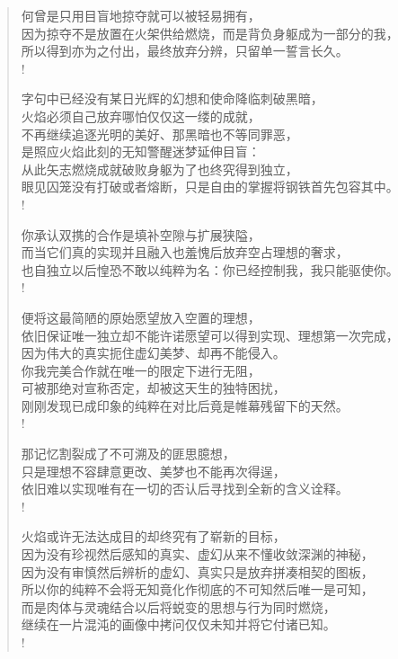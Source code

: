 \documentclass[UTF8, 12pt, a4paper]{ctexrep} %
\begin{document}
\begin{verse}
何曾是只用目盲地掠夺就可以被轻易拥有，\\
因为掠夺不是放置在火架供给燃烧，而是背负身躯成为一部分的我，\\
所以得到亦为之付出，最终放弃分辨，只留单一誓言长久。\\!

字句中已经没有某日光辉的幻想和使命降临刺破黑暗，\\
火焰必须自己放弃哪怕仅仅这一缕的成就，\\
不再继续追逐光明的美好、那黑暗也不等同罪恶，\\
是照应火焰此刻的无知警醒迷梦延伸目盲：\\
从此矢志燃烧成就破败身躯为了也终究得到独立，\\
眼见囚笼没有打破或者熔断，只是自由的掌握将钢铁首先包容其中。\\!

你承认双携的合作是填补空隙与扩展狭隘，\\
而当它们真的实现并且融入也羞愧后放弃空占理想的奢求，\\
也自独立以后惶恐不敢以纯粹为名：你已经控制我，我只能驱使你。\\!

便将这最简陋的原始愿望放入空置的理想，\\
依旧保证唯一独立却不能许诺愿望可以得到实现、理想第一次完成，\\
因为伟大的真实扼住虚幻美梦、却再不能侵入。\\
你我完美合作就在唯一的限定下进行无阻，\\
可被那绝对宣称否定，却被这天生的独特困扰，\\
刚刚发现已成印象的纯粹在对比后竟是帷幕残留下的天然。\\!

那记忆割裂成了不可溯及的匪思臆想，\\
只是理想不容肆意更改、美梦也不能再次得逞，\\
依旧难以实现唯有在一切的否认后寻找到全新的含义诠释。\\!

火焰或许无法达成目的却终究有了崭新的目标，\\
因为没有珍视然后感知的真实、虚幻从来不懂收敛深渊的神秘，\\
因为没有审慎然后辨析的虚幻、真实只是放弃拼凑相契的图板，\\
所以你的纯粹不会将无知竟化作彻底的不可知然后唯一是可知，\\
而是肉体与灵魂结合以后将蜕变的思想与行为同时燃烧，\\
继续在一片混沌的画像中拷问仅仅未知并将它付诸已知。\\!


\end{verse}
\end{document}
